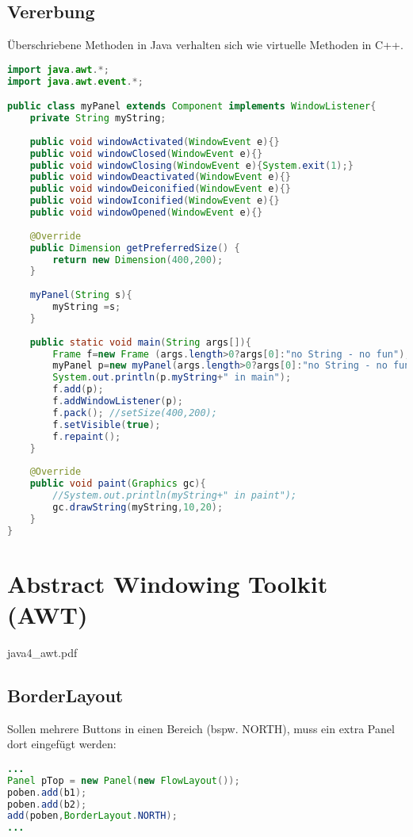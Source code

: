 \subsection{Vererbung}
Überschriebene Methoden in Java verhalten sich wie virtuelle Methoden in C++.

\begin{lstlisting}[language=Java]
import java.awt.*;
import java.awt.event.*;

public class myPanel extends Component implements WindowListener{
	private String myString;
	
	public void windowActivated(WindowEvent e){}
	public void windowClosed(WindowEvent e){}
	public void windowClosing(WindowEvent e){System.exit(1);}
	public void windowDeactivated(WindowEvent e){}
	public void windowDeiconified(WindowEvent e){}
	public void windowIconified(WindowEvent e){}
	public void windowOpened(WindowEvent e){}
	
	@Override
	public Dimension getPreferredSize()	{
		return new Dimension(400,200);
	}
	
	myPanel(String s){
		myString =s;
	}
	
	public static void main(String args[]){
		Frame f=new Frame (args.length>0?args[0]:"no String - no fun");
		myPanel p=new myPanel(args.length>0?args[0]:"no String - no fun");
		System.out.println(p.myString+" in main");
		f.add(p);
		f.addWindowListener(p);
		f.pack(); //setSize(400,200);
		f.setVisible(true);
		f.repaint();
	}
	
	@Override
	public void paint(Graphics gc){
		//System.out.println(myString+" in paint");
		gc.drawString(myString,10,20);
	}
}
\end{lstlisting}

\section{Abstract Windowing Toolkit (AWT)}
java4\_awt.pdf
\subsection{BorderLayout}
Sollen mehrere Buttons in einen Bereich (bspw. NORTH), muss ein extra Panel dort eingefügt werden:
\begin{lstlisting}[language=Java]
...
Panel pTop = new Panel(new FlowLayout());
poben.add(b1);
poben.add(b2);
add(poben,BorderLayout.NORTH);
...
\end{lstlisting}

